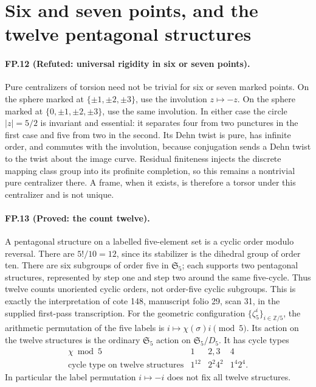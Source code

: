 \section*{Six and seven points, and the twelve pentagonal structures}
\paragraph{FP.12 (Refuted: universal rigidity in six or seven points).}
Pure centralizers of torsion need not be trivial for six or seven marked
points. On the sphere marked at $\{\pm1,\pm2,\pm3\}$, use the involution
$z\mapsto-z$. On the sphere marked at
$\{0,\pm1,\pm2,\pm3\}$, use the same involution. In either case the
circle $|z|=5/2$ is invariant and essential: it separates four from two
punctures in the first case and five from two in the second.
Its Dehn twist is pure, has infinite order, and commutes with the
involution, because conjugation sends a Dehn twist to the twist about the
image curve. Residual finiteness injects the discrete mapping class group
into its profinite completion, so this remains a nontrivial pure
centralizer there. A frame, when it exists, is therefore a torsor under
this centralizer and is not unique.

\paragraph{FP.13 (Proved: the count twelve).}
A pentagonal structure on a labelled five-element set is a cyclic order
modulo reversal. There are $5!/10=12$, since its stabilizer is the dihedral
group of order ten. There are six subgroups of order five in
$\mathfrak S_5$; each supports two pentagonal structures, represented by
step one and step two around the same five-cycle. Thus twelve counts
unoriented cyclic orders, not order-five cyclic subgroups. This is exactly
the interpretation of cote 148, manuscript folio 29, scan 31, in the
supplied first-pass transcription.
For the geometric configuration $\{\zeta_5^i\}_{i\in\mathbb Z/5}$,
the arithmetic permutation of the five labels is
$i\mapsto\chi(\sigma)i\pmod5$. Its action on the twelve structures
is the ordinary $\mathfrak S_5$ action on
$\mathfrak S_5/D_5$. It has cycle types
\[
 \begin{array}{c|ccc}
 \chi\bmod5&1&2,3&4\\\hline
 \text{cycle type on twelve structures}&1^{12}&2^2 4^2&1^4 2^4.
 \end{array}
\]
In particular the label permutation $i\mapsto-i$ does not fix all
twelve structures.


